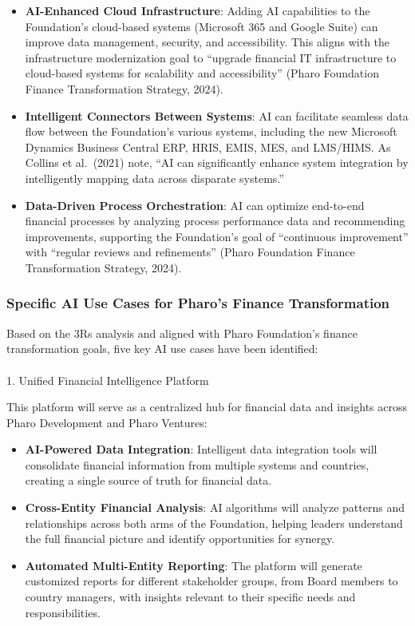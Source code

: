 \documentclass[
]{article}
\makeatletter
\let\oldparagraph\paragraph
\renewcommand{\paragraph}{
    \@ifstar
      \xxxParagraphStar
      \xxxParagraphNoStar
  }
\newcommand{\xxxParagraphStar}[1]{\oldparagraph*{#1}\mbox{}}
\newcommand{\xxxParagraphNoStar}[1]{\oldparagraph{#1}\mbox{}}
\makeatother
\begin{document}
\begin{itemize}
\item
  \textbf{AI-Enhanced Cloud Infrastructure}: Adding AI capabilities to
  the Foundation's cloud-based systems (Microsoft 365 and Google Suite)
  can improve data management, security, and accessibility. This aligns
  with the infrastructure modernization goal to ``upgrade financial IT
  infrastructure to cloud-based systems for scalability and
  accessibility'' (Pharo Foundation Finance Transformation Strategy,
  2024).
\item
  \textbf{Intelligent Connectors Between Systems}: AI can facilitate
  seamless data flow between the Foundation's various systems, including
  the new Microsoft Dynamics Business Central ERP, HRIS, EMIS, MES, and
  LMS/HIMS. As Collins et al.~(2021) note, ``AI can significantly
  enhance system integration by intelligently mapping data across
  disparate systems.''
\item
  \textbf{Data-Driven Process Orchestration}: AI can optimize end-to-end
  financial processes by analyzing process performance data and
  recommending improvements, supporting the Foundation's goal of
  ``continuous improvement'' with ``regular reviews and refinements''
  (Pharo Foundation Finance Transformation Strategy, 2024).
\end{itemize}

\subsubsection{Specific AI Use Cases for Pharo's Finance
Transformation}\label{specific-ai-use-cases-for-pharos-finance-transformation}

Based on the 3Rs analysis and aligned with Pharo Foundation's finance
transformation goals, five key AI use cases have been identified:

\paragraph{1. Unified Financial Intelligence
Platform}\label{unified-financial-intelligence-platform}

This platform will serve as a centralized hub for financial data and
insights across Pharo Development and Pharo Ventures:

\begin{itemize}
\item
  \textbf{AI-Powered Data Integration}: Intelligent data integration
  tools will consolidate financial information from multiple systems and
  countries, creating a single source of truth for financial data.
\item
  \textbf{Cross-Entity Financial Analysis}: AI algorithms will analyze
  patterns and relationships across both arms of the Foundation, helping
  leaders understand the full financial picture and identify
  opportunities for synergy.
\item
  \textbf{Automated Multi-Entity Reporting}: The platform will generate
  customized reports for different stakeholder groups, from Board
  members to country managers, with insights relevant to their specific
  needs and responsibilities.
\end{itemize}
\end{document}
